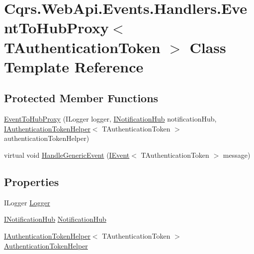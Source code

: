 \hypertarget{classCqrs_1_1WebApi_1_1Events_1_1Handlers_1_1EventToHubProxy}{}\section{Cqrs.\+Web\+Api.\+Events.\+Handlers.\+Event\+To\+Hub\+Proxy$<$ T\+Authentication\+Token $>$ Class Template Reference}
\label{classCqrs_1_1WebApi_1_1Events_1_1Handlers_1_1EventToHubProxy}
\subsection*{Protected Member Functions}
\begin{DoxyCompactItemize}
\item 
\hyperlink{classCqrs_1_1WebApi_1_1Events_1_1Handlers_1_1EventToHubProxy_a11ce35ab8f01b97b95b757e246c9cdcd_a11ce35ab8f01b97b95b757e246c9cdcd}{Event\+To\+Hub\+Proxy} (I\+Logger logger, \hyperlink{interfaceCqrs_1_1WebApi_1_1SignalR_1_1Hubs_1_1INotificationHub}{I\+Notification\+Hub} notification\+Hub, \hyperlink{interfaceCqrs_1_1Authentication_1_1IAuthenticationTokenHelper}{I\+Authentication\+Token\+Helper}$<$ T\+Authentication\+Token $>$ authentication\+Token\+Helper)
\item 
virtual void \hyperlink{classCqrs_1_1WebApi_1_1Events_1_1Handlers_1_1EventToHubProxy_a310fc8d40bfbe514406716150f30b74d_a310fc8d40bfbe514406716150f30b74d}{Handle\+Generic\+Event} (\hyperlink{interfaceCqrs_1_1Events_1_1IEvent}{I\+Event}$<$ T\+Authentication\+Token $>$ message)
\end{DoxyCompactItemize}
\subsection*{Properties}
\begin{DoxyCompactItemize}
\item 
I\+Logger \hyperlink{classCqrs_1_1WebApi_1_1Events_1_1Handlers_1_1EventToHubProxy_a120e7cd3ad97d9e6382df657b9c98c4c_a120e7cd3ad97d9e6382df657b9c98c4c}{Logger}
\item 
\hyperlink{interfaceCqrs_1_1WebApi_1_1SignalR_1_1Hubs_1_1INotificationHub}{I\+Notification\+Hub} \hyperlink{classCqrs_1_1WebApi_1_1Events_1_1Handlers_1_1EventToHubProxy_a3e27dc5fb1315bc8200487fbf9b3b47f_a3e27dc5fb1315bc8200487fbf9b3b47f}{Notification\+Hub}
\item 
\hyperlink{interfaceCqrs_1_1Authentication_1_1IAuthenticationTokenHelper}{I\+Authentication\+Token\+Helper}$<$ T\+Authentication\+Token $>$ \hyperlink{classCqrs_1_1WebApi_1_1Events_1_1Handlers_1_1EventToHubProxy_af5593d8e6bace37fa52545c1f8e65e32_af5593d8e6bace37fa52545c1f8e65e32}{Authentication\+Token\+Helper}
\end{DoxyCompactItemize}


